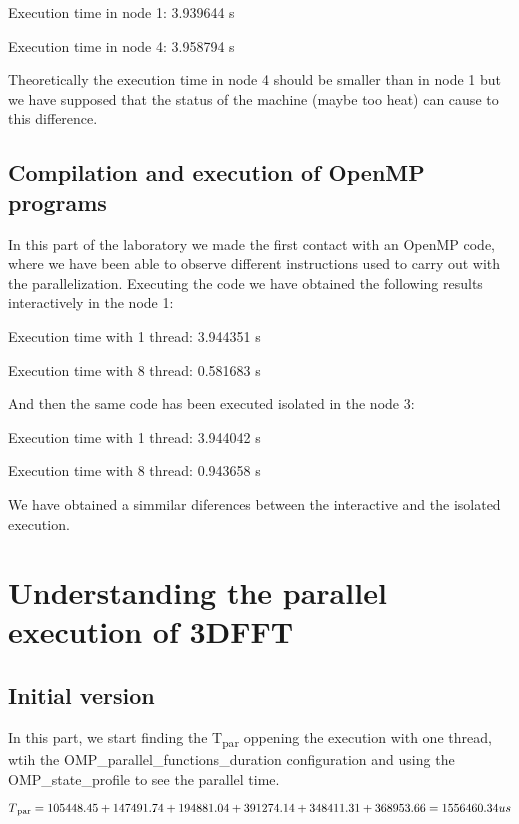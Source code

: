 \documentclass[12pt, a4paper]{article}
\begin{document}
Execution time in node 1: 3.939644 s

Execution time in node 4: 3.958794 s\newline

Theoretically the execution time in node 4 should be smaller than in node 1 but we have supposed that the status of the machine (maybe too heat) can cause to this difference.

\subsection{Compilation and execution of OpenMP programs}

In this part of the laboratory we made the first contact with an OpenMP code, where we have been able to observe different instructions used to carry out with the parallelization.
Executing the code we have obtained the following results interactively in the node 1:\newline

Execution time with 1 thread: 3.944351 s

Execution time with 8 thread: 0.581683 s\newline

And then the same code has been executed isolated in the node 3:\newline

Execution time with 1 thread: 3.944042 s

Execution time with 8 thread: 0.943658 s\newline

We have obtained a simmilar diferences between the interactive and the isolated execution.

\newpage
\section{Understanding the parallel execution of 3DFFT}
\subsection{Initial version}

In this part, we start finding the T\textsubscript{par} oppening the execution with one thread, wtih the OMP\_parallel\_functions\_duration configuration and using the OMP\_state\_profile to see the parallel time.

\begin{equation}
	T\textsubscript{par} = 105448.45 + 147491.74 + 194881.04 + 391274.14 + 348411.31 + 368953.66 = 1556460.34 us
\end{equation}
\end{document}
